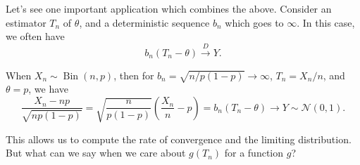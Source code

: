Let's see one important application which combines the above. Consider an estimator \(T_n\) of \(\theta \), and a deterministic sequence \(b_n\) which goes to \(\infty \). In this case, we often have
\[
	b_n (T_n - \theta ) \overset{D}{\to } Y.
\]

\begin{eg}
	When \(X_n \sim \operatorname{Bin}(n, p) \), then for \(b_n = \sqrt{n / p (1 - p)} \to \infty \), \(T_n = X_n / n\), and \(\theta = p\), we have
	\[
		\frac{X_n - n p}{\sqrt{n p (1 - p)} }
		= \sqrt{\frac{n}{p (1 - p)}} \left( \frac{X_n}{n} - p \right)
		= b_n (T_n - \theta )
		\to Y \sim \mathcal{N} (0, 1).
	\]
\end{eg}

This allows us to compute the rate of convergence and the limiting distribution. But what can we say when we care about \(g(T_n)\) for a function \(g\)?

